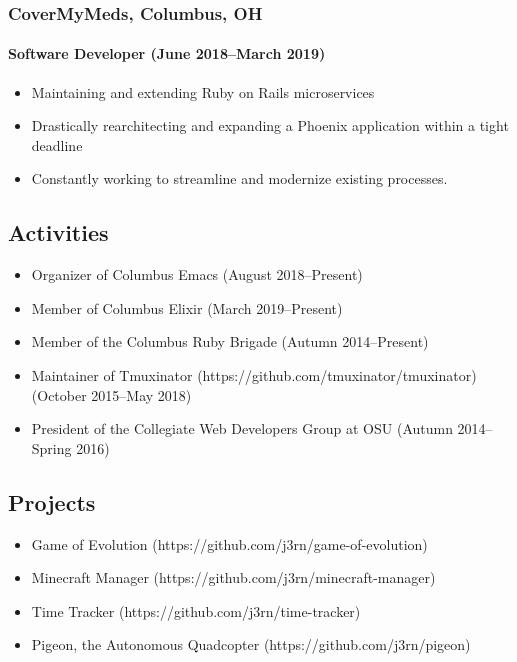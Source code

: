 \documentclass[]{article}
\begin{document}
\subsubsection*{CoverMyMeds, Columbus, OH}
\paragraph*{Software Developer (June 2018--March 2019)}
\begin{itemize}
\item Maintaining and extending Ruby on Rails microservices
\item Drastically rearchitecting and expanding a Phoenix application within a tight deadline
\item Constantly working to streamline and modernize existing processes.
\end{itemize}

\subsection*{Activities}
\begin{itemize}
\item Organizer of Columbus Emacs (August 2018--Present)
\item Member of Columbus Elixir (March 2019--Present)
\item Member of the Columbus Ruby Brigade (Autumn 2014--Present)
\item Maintainer of Tmuxinator (https://github.com/tmuxinator/tmuxinator) (October 2015--May 2018)
\item President of the Collegiate Web Developers Group at OSU (Autumn 2014--Spring 2016)
\end{itemize}

\subsection*{Projects}
\begin{itemize}
\item Game of Evolution (https://github.com/j3rn/game-of-evolution)
\item Minecraft Manager (https://github.com/j3rn/minecraft-manager)
\item Time Tracker (https://github.com/j3rn/time-tracker)
\item Pigeon, the Autonomous Quadcopter (https://github.com/j3rn/pigeon)
\end{itemize}
\end{document}
